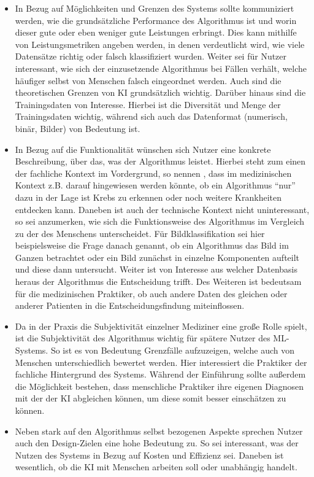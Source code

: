 \begin{itemize}
    \item In Bezug auf Möglichkeiten und Grenzen des Systems sollte kommuniziert werden, wie die grundsätzliche Performance des Algorithmus ist und worin dieser gute oder eben weniger gute Leistungen erbringt. Dies kann mithilfe von Leistungsmetriken angeben werden, in denen verdeutlicht wird, wie viele Datensätze richtig oder falsch klassifiziert wurden. Weiter sei für Nutzer interessant, wie sich der einzusetzende Algorithmus bei Fällen verhält, welche häufiger selbst von Menschen falsch eingeordnet werden. Auch sind die theoretischen Grenzen von KI grundsätzlich wichtig. Darüber hinaus sind die Trainingsdaten von Interesse. Hierbei ist die Diversität und Menge der Trainingsdaten wichtig, während sich auch das Datenformat (numerisch, binär, Bilder) von Bedeutung ist.
    \item In Bezug auf die Funktionalität wünschen sich Nutzer eine konkrete Beschreibung, über das, was der Algorithmus leistet. Hierbei steht zum einen der fachliche Kontext im Vordergrund, so nennen \cite{cai2019hello}, dass im medizinischen Kontext z.B. darauf hingewiesen werden könnte, ob ein Algorithmus \enquote{nur} dazu in der Lage ist Krebs zu erkennen oder noch weitere Krankheiten entdecken kann. Daneben ist auch der technische Kontext nicht uninteressant, so sei anzumerken, wie sich die Funktionsweise des Algorithmus im Vergleich zu der des Menschens unterscheidet. Für Bildklassifikation sei hier beispielsweise die Frage danach genannt, ob ein Algorithmus das Bild im Ganzen betrachtet oder ein Bild zunächst in einzelne Komponenten aufteilt und diese dann untersucht. Weiter ist von Interesse aus welcher Datenbasis heraus der Algorithmus die Entscheidung trifft. Des Weiteren ist bedeutsam für die medizinischen Praktiker, ob auch andere Daten des gleichen oder anderer Patienten in die Entscheidungsfindung miteinflossen.
    \item Da in der Praxis die Subjektivität einzelner Mediziner eine große Rolle spielt, ist die Subjektivität des Algorithmus wichtig für spätere Nutzer des ML-Systems. So ist es von Bedeutung Grenzfälle aufzuzeigen, welche auch von Menschen unterschiedlich bewertet werden. Hier interessiert die Praktiker der fachliche Hintergrund des Systems. Während der Einführung sollte außerdem die Möglichkeit bestehen, dass menschliche Praktiker ihre eigenen Diagnosen mit der der KI abgleichen können, um diese somit besser einschätzen zu können.
    \item Neben stark auf den Algorithmus selbst bezogenen Aspekte sprechen Nutzer auch den Design-Zielen eine hohe Bedeutung zu. So sei interessant, was der Nutzen des Systems in Bezug auf Kosten und Effizienz sei. Daneben ist wesentlich, ob die KI mit Menschen arbeiten soll oder unabhängig handelt.

\end{itemize}

